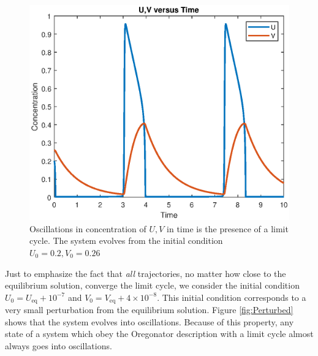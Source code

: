 \documentclass[twocolumn,amsmath,amssymb,aps]{revtex4}
\begin{document}
\begin{figure}[!htb]
	\centering
	\includegraphics[scale=0.5]{UV_Time.eps}
	\caption{Oscillations in concentration of $U,V$ in time is the presence of a limit cycle. The system evolves from the initial condition $U_0 = 0.2, V_0 = 0.26$}
	\label{fig:UVTime}
\end{figure}


Just to emphasize the fact that \textit{all} trajectories, no matter how close to the equilibrium solution, converge the limit cycle, we consider the initial condition $U_0 = U_{\text{eq}} + 10^{-7}$ and $V_0 = V_{\text{eq}} + 4\times 10^{-8}$. This initial condition corresponds to a very small perturbation from the equilibrium solution. Figure \ref{fig:Perturbed} shows that the system evolves into oscillations. Because of this property, any state of a system which obey the Oregonator description with a limit cycle almost always goes into oscillations.
\end{document}
